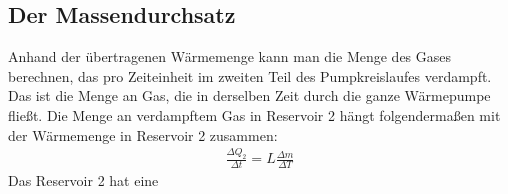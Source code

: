 \subsection{Der Massendurchsatz \cite[vgl.]{man:v206}}
Anhand der übertragenen Wärmemenge kann man die Menge des Gases berechnen, das pro Zeiteinheit
im zweiten Teil des Pumpkreislaufes verdampft.
Das ist die Menge an Gas, die in derselben Zeit durch die ganze Wärmepumpe fließt.
Die Menge an verdampftem Gas in Reservoir 2 hängt folgendermaßen mit der Wärmemenge in Reservoir 2 zusammen:
\begin{align}
    \frac{\Delta Q_2}{\Delta t} = L \frac{\Delta m}{\Delta T}
\end{align} 
Das Reservoir 2 hat eine 